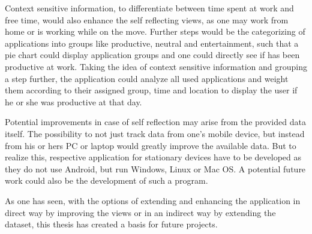 Context  sensitive information, to differentiate between time spent at work and free time, would also enhance the self reflecting views, as one may work from home or is working while on the move. Further steps would be the categorizing of applications into groups like productive, neutral and entertainment, such that a pie chart could display application groups and one could directly see if has been productive at work. Taking the idea of context sensitive information and grouping a step further, the application could analyze all used applications and weight them according to their assigned group, time and location to display the user if he or she was productive at that day.

Potential  improvements in case of self reflection may arise from the provided data itself. The possibility to not just track data from one's mobile device, but instead from his or hers PC or laptop would greatly improve the available data. But to realize this, respective application for stationary devices have to be developed as they do not use Android, but run Windows, Linux or Mac OS. A potential future work could also be the development of such a program.

As one has seen, with the options of extending and enhancing the application in direct way by improving the views or in an indirect way by extending the dataset, this thesis has created a basis for future projects. 
\newpage